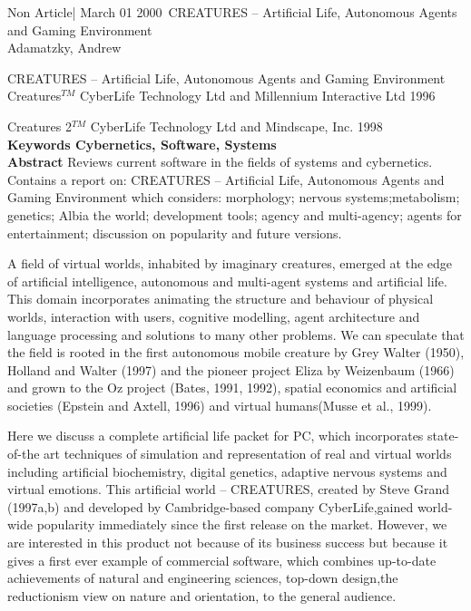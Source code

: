 \documentclass[11pt,twoside,a4paper]{article}
\begin{document}
{\huge Non Article| March 01 2000~\newline CREATURES -- Artificial Life, Autonomous Agents and Gaming Environment}~\\
{\large Adamatzky, Andrew}

CREATURES -- Artificial Life, Autonomous Agents and Gaming Environment Creatures$^{TM}$ CyberLife Technology Ltd and Millennium Interactive Ltd 1996

Creatures 2$^{TM}$ CyberLife Technology Ltd and Mindscape, Inc. 1998~\\
\textbf{Keywords Cybernetics, Software, Systems}~\\

\textbf{Abstract} Reviews current software in the fields of systems and cybernetics. Contains a report on: CREATURES -- Artificial Life, Autonomous Agents and Gaming Environment which considers: morphology; nervous systems;metabolism; genetics; Albia the world; development tools; agency and multi-agency; agents for entertainment; discussion on popularity and future versions.

A field of virtual worlds, inhabited by imaginary creatures, emerged at the edge of artificial intelligence, autonomous and multi-agent systems and artificial life. This domain incorporates animating the structure and behaviour of physical worlds, interaction with users, cognitive modelling, agent architecture and language processing and solutions to many other problems. We can speculate that the field is rooted in the first autonomous mobile creature by Grey Walter (1950), Holland and Walter (1997) and the pioneer project Eliza by Weizenbaum (1966) and grown to the Oz project (Bates, 1991, 1992), spatial economics and artificial societies (Epstein and Axtell, 1996) and virtual humans(Musse et al., 1999).

Here we discuss a complete artificial life packet for PC, which incorporates state-of-the art techniques of simulation and representation of real and virtual worlds including artificial biochemistry, digital genetics, adaptive nervous systems and virtual emotions. This artificial world -- CREATURES, created by Steve Grand (1997a,b) and developed by Cambridge-based company CyberLife,gained world-wide popularity immediately since the first release on the market. However, we are interested in this product not because of its business success but because it gives a first ever example of commercial software, which combines up-to-date achievements of natural and engineering sciences, top-down design,the reductionism view on nature and orientation, to the general audience.
\end{document}
